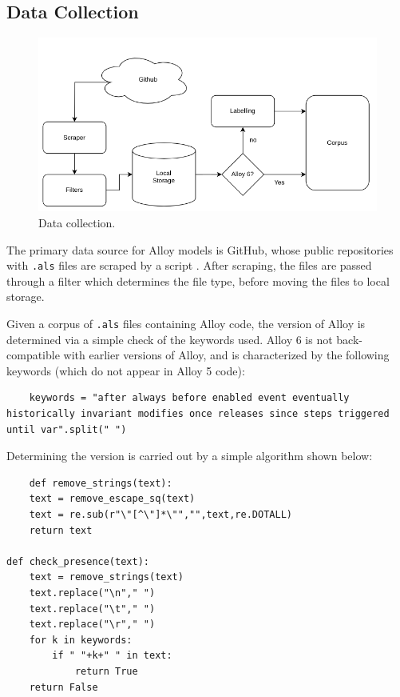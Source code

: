 \documentclass[conference]{IEEEtran}
\begin{document}
\subsection{Data Collection}

\begin{figure}[htbp]
    \centerline{\includegraphics[width=\linewidth]{"./images/scraping.png"}}
    \caption{Data collection.}
    \label{fig}
    \end{figure}

The primary data source for Alloy models is GitHub, whose public repositories with \verb|.als| files are scraped by a script \cite{catalyst}. After scraping, the files are passed through a filter which determines the file type, before moving the files to local storage.

Given a corpus of \verb|.als| files containing Alloy code, the version of Alloy is determined via a simple check of the keywords used. Alloy 6 is not back-compatible with earlier versions of Alloy, and is characterized by the following keywords (which do not appear in Alloy 5 code):

\begin{lstlisting}
    keywords = "after always before enabled event eventually historically invariant modifies once releases since steps triggered until var".split(" ")
\end{lstlisting}

Determining the version is carried out by a simple algorithm shown below:

\begin{lstlisting}
    def remove_strings(text):
	text = remove_escape_sq(text)
	text = re.sub(r"\"[^\"]*\"","",text,re.DOTALL)
	return text

def check_presence(text):
	text = remove_strings(text)
	text.replace("\n"," ")
	text.replace("\t"," ")
	text.replace("\r"," ")
	for k in keywords:
		if " "+k+" " in text:
			return True
	return False
\end{lstlisting}
\end{document}

